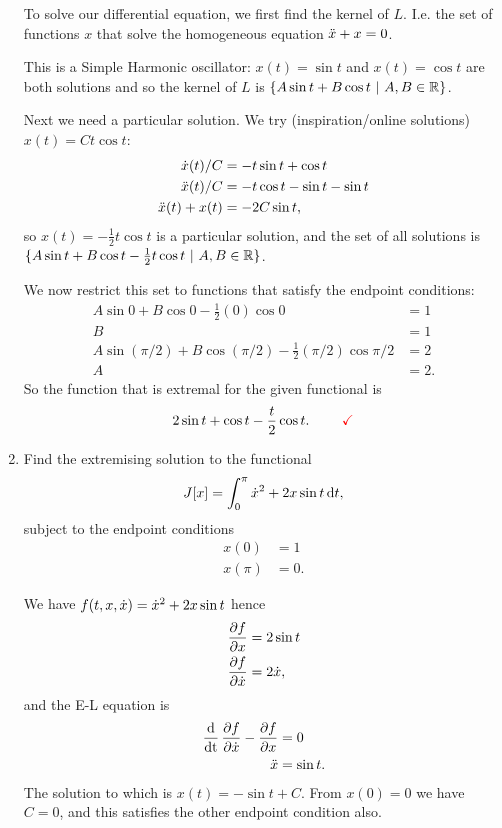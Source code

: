 \begin{enumerate}
  To solve our differential equation, we first find the kernel of $L$. I.e. the set of functions $x$ that solve
  the homogeneous equation $\ddot{x} + x = 0$.

  This is a Simple Harmonic oscillator: $x(t) = \sin t$ and $x(t) = \cos t$ are both solutions and so the
  kernel of $L$ is $\{A\sin t + B\cos t ~|~ A, B \in \mathbb{R}\}$.


  Next we need a particular solution. We try (inspiration/online solutions) $x(t) = Ct\cos t$:
  \begin{align*}
    \dot{x}(t)/C      &= -t\sin t + \cos t \\
    \ddot{x}(t)/C      &= -t\cos t - \sin t - \sin t \\
    \ddot{x}(t) + x(t) &= -2C\sin t,
  \end{align*}
  so $x(t) = -\frac{1}{2}t\cos t$ is a particular solution, and the set of all solutions is
  $\{A\sin t + B\cos t - \frac{1}{2}t\cos t ~|~ A, B \in \mathbb{R}\}$.

  We now restrict this set to functions that satisfy the endpoint conditions:
  \begin{align*}
    A\sin 0 + B\cos 0 - \frac{1}{2}(0)\cos 0                     &= 1 \\
    B                                                            &= 1 \\
    A\sin (\pi/2) + B\cos (\pi/2) - \frac{1}{2}(\pi/2)\cos \pi/2 &= 2 \\
    A                                                            &= 2.
  \end{align*}
  So the function that is extremal for the given functional is
  \begin{align*}
    2\sin t + \cos t - \frac{t}{2}\cos t. ~~~~~~~ \textcolor{red}{\checkmark}
  \end{align*}
\item
  \begin{mdframed}
    Find the extremising solution to the functional
    \begin{align*}
      J[x] = \int_0^{\pi} \xdot^2 + 2x\sin t \dt,
    \end{align*}
    subject to the endpoint conditions
    \begin{align*}
      x(0) &= 1 \\
      x(\pi) &= 0.
    \end{align*}
  \end{mdframed}
  We have $f(t, x, \dot{x}) = \dot{x}^2 + 2x\sin t$ hence
  \begin{align*}
    \frac{\partial f}{\partial x}  &= 2\sin t \\
    \frac{\partial f}{\partial \dot{x}} &= 2\dot{x},
  \end{align*}
  and the E-L equation is
  \begin{align*}
    \operatorname{\frac{\text{d}}{\text{dt}}} \frac{\partial f}{\partial \dot{x}} - \frac{\partial f}{\partial x} &= 0 \\
    \ddot{x} &= \sin t.
  \end{align*}
  The solution to which is $x(t) = -\sin t + C$. From $x(0) = 0$ we have $C = 0$, and
  this satisfies the other endpoint condition also.


\end{enumerate}
